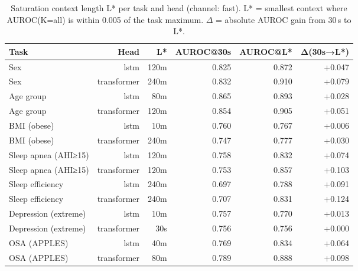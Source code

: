 \begin{table}[ht]
\centering
\caption{Saturation context length L* per task and head (channel: fast). L* = smallest context where AUROC(K=all) is within 0.005 of the task maximum. $\Delta$ = absolute AUROC gain from 30\,s to L*.}
\label{tab:lstar_fast}
\begin{tabular}{lrrrrr}
\toprule
Task & Head & L* & AUROC@30s & AUROC@L* & Δ(30s→L*) \\
\midrule
Sex & lstm & 120m & 0.825 & 0.872 & +0.047 \\
Sex & transformer & 240m & 0.832 & 0.910 & +0.079 \\
Age group & lstm & 80m & 0.865 & 0.893 & +0.028 \\
Age group & transformer & 120m & 0.854 & 0.905 & +0.051 \\
BMI (obese) & lstm & 10m & 0.760 & 0.767 & +0.006 \\
BMI (obese) & transformer & 240m & 0.747 & 0.777 & +0.030 \\
Sleep apnea (AHI≥15) & lstm & 120m & 0.758 & 0.832 & +0.074 \\
Sleep apnea (AHI≥15) & transformer & 120m & 0.753 & 0.857 & +0.103 \\
Sleep efficiency & lstm & 240m & 0.697 & 0.788 & +0.091 \\
Sleep efficiency & transformer & 240m & 0.707 & 0.831 & +0.124 \\
Depression (extreme) & lstm & 10m & 0.757 & 0.770 & +0.013 \\
Depression (extreme) & transformer & 30s & 0.756 & 0.756 & +0.000 \\
OSA (APPLES) & lstm & 40m & 0.769 & 0.834 & +0.064 \\
OSA (APPLES) & transformer & 80m & 0.789 & 0.888 & +0.098 \\
\bottomrule
\end{tabular}
\end{table}